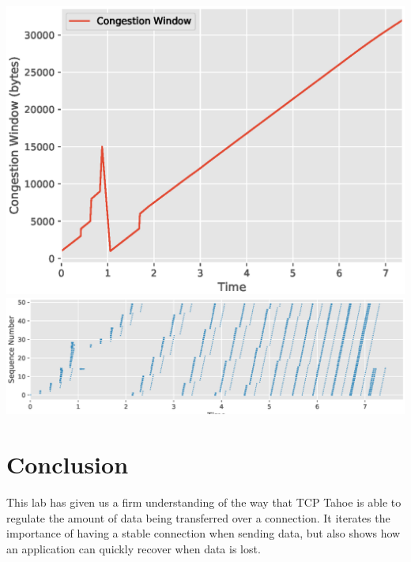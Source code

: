 \documentclass[a4paper,11pt]{article}
\begin{document}
\begin{center}
\includegraphics[width=\linewidth]{graphs-3drop/cwnd}
\includegraphics[width=\linewidth]{graphs-3drop/sequence}
\end{center}

\pagebreak

\section*{Conclusion}
This lab has given us a firm understanding of the way that TCP Tahoe is able to regulate the amount of data being transferred over a connection. It iterates the importance of having a stable connection when sending data, but also shows how an application can quickly recover when data is lost. 
\end{document}

